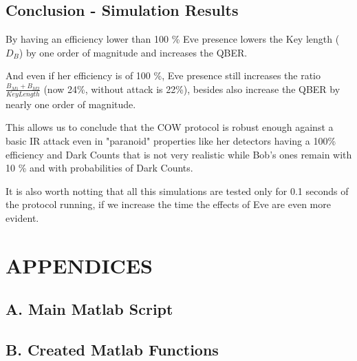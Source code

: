 \begin{refsection}
\pagebreak
\subsection{Conclusion - Simulation Results}

By having an efficiency lower than 100 \% Eve presence lowers the Key length ($D_B$) by one order of magnitude and increases the QBER.

And even if her efficiency is of 100 \%, Eve presence still increases the ratio $\frac{B_{M1}+B_{M2}}{Key Length}$ (now 24\%, without attack is 22\%), besides also increase the QBER by nearly one order of magnitude.

This allows us to conclude that the COW protocol is robust enough against a basic IR attack even in "paranoid" properties like her detectors having a 100\% efficiency and Dark Counts that is not very realistic while Bob's ones remain with 10 \% and with probabilities of Dark Counts.

It is also worth notting that all this simulations are tested only for 0.1 seconds of the protocol running, if we increase the time the effects of Eve are even more evident.

\section*{APPENDICES}
\subsection{A. Main Matlab Script}



{\scriptsize }

\subsection{B. Created Matlab Functions}

{\scriptsize }

\clearpage
\printbibliography[heading=subbibliography]
\end{refsection}
\cleardoublepage
